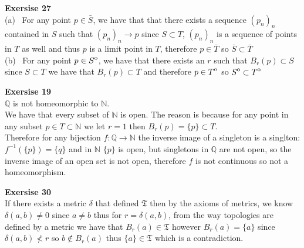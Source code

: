 \documentclass[12pt]{article}
\newenvironment{ques}[1]{\textbf{Exersise #1}\vspace{1 mm}\\ }{\bigskip}
\theoremstyle{definition}
\newcommand{\Q}{\mathbb Q}
\newcommand{\N}{\mathbb N}
\newcommand{\interior}[1]{%
  {\kern0pt#1}^{\mathrm{o}}%
}
\newcommand{\T}{\mathfrak{T}}
\begin{document}
\begin{ques}{27}
	(a) \ For any point $p \in \bar S$, we have that that there exists a
	sequence $(p_n)_n$ contained in $S$ such that $(p_n)_n \to p$ since $S
	\subset T$, $(p_n)_n$ is a sequence of points in $T$ as well and thus $p$
	is a limit point in $T$, therefore $p \in \bar T$ so $\bar S \subset \bar
	T$\\
	(b) \ For any point $p \in \interior S$, we have that there exists an $r$
	such that $B_r(p) \subset S$ since $S \subset T$ we have that $B_r(p)
	\subset T$ and therefore $p \in \interior T$ so $\interior S \subset
	\interior T$
\end{ques}

\begin{ques}{19}
	$\Q$ is not homeomorphic to $\N$. \\
	We have that every subset of $\N$ is open. The reason is because for any
	point in any subset $p \in T \subset \N$ we let $r = 1$ then $B_r(p) =
	\{p\} \subset T$.\\
	Therefore for any bijection $f:\Q \to \N$ the inverse image of a singleton
	is a singlton: $f^{-1}(\{p\}) = \{q\}$ and in $\N$ $\{p\}$ is open, but
	singletons in $\Q$ are not open, so the inverse image of an open set is not
	open, therefore $f$ is not continuous so not a homeomorphism.
\end{ques}

\begin{ques}{30}
	If there exists a metric $\delta$ that defined $\T$ then by the axioms of
	metrics, we know $\delta(a,b) \neq 0$ since $a \neq b$ thus for $r =
	\delta(a,b)$, from the way topologies are defined by a metric we have that
	$B_r(a) \in \T$ however $B_r(a) = \{a\}$ since $\delta(a,b) \not < r$ so $b
	\notin B_r(a)$ thus $\{a\} \in \T$ which is a contradiction.
\end{ques}
\end{document}

